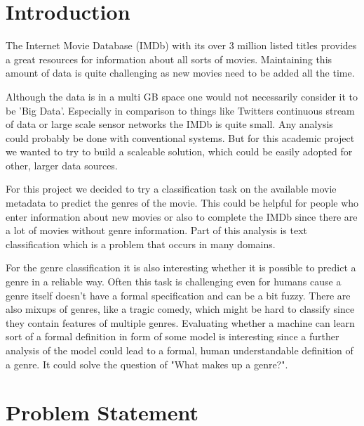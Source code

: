 \documentclass{vldb}
\begin{document}
\section{Introduction}

\par The Internet Movie Database (IMDb) \cite{imdb} with its over 3 million listed titles provides a great resources for information about all sorts of movies. Maintaining this amount of data is quite challenging as new movies need to be added all the time.
\par Although the data is in a multi GB space one would not necessarily consider it to be 'Big Data'. Especially in comparison to things like Twitters continuous stream of data or large scale sensor networks the IMDb is quite small. Any analysis could probably be done with conventional systems. But for this academic project we wanted to try to build a scaleable solution, which could be easily adopted for other, larger data sources.

\par For this project we decided to try a classification task on the available movie metadata to predict the genres of the movie. This could be helpful for people who enter information about new movies or also to complete the IMDb since there are a lot of movies without genre information.
Part of this analysis is text classification which is a problem that occurs in many domains.

\par For the genre classification it is also interesting whether it is possible to predict a genre in a reliable way. Often this task is challenging even for humans cause a genre itself doesn't have a formal specification and can be a bit fuzzy. There are also mixups of genres, like a tragic comedy, which might be hard to classify since they contain features of multiple genres. Evaluating whether a machine can learn sort of a formal definition in form of some model is interesting since a further analysis of the model could lead to a formal, human understandable definition of a genre. It could solve the question of "What makes up a genre?".



\section{Problem Statement}
\end{document}
